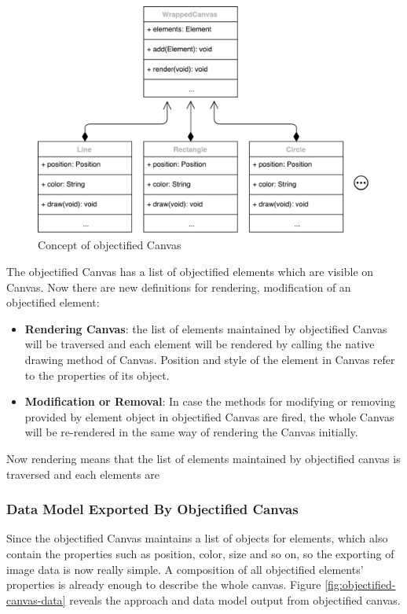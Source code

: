 \begin{figure}[!htbp]
  \centering
    \includegraphics[width=1\textwidth]{Figures/concept-wrapped-canvas.pdf}
  \caption{Concept of objectified Canvas}
  \label{fig:objectified-canvas}
\end{figure}
The objectified Canvas has a list of objectified elements which are visible on Canvas. Now there are new definitions for rendering, modification of an objectified element:
\begin{itemize}
\item
\textbf{Rendering Canvas}: the list of elements maintained by objectified Canvas will be traversed and each element will be rendered by calling the native drawing method of Canvas. Position and style of the element in Canvas refer to the properties of its object.  
\item
\textbf{Modification or Removal}: In case the methods for modifying or removing provided by element object in objectified Canvas are fired, the whole Canvas will be re-rendered in the same way of rendering the Canvas initially.

\end{itemize}
Now rendering means that the list of elements maintained by objectified canvas is traversed and each elements are 

\subsubsection{Data Model Exported By Objectified Canvas}
Since the objectified Canvas maintains a list of objects for elements, which also contain the properties such as position, color, size and so on, so the exporting of image data is now really simple. A composition of all objectified elements' properties is already enough to describe the whole canvas. Figure \ref{fig:objectified-canvas-data} reveals the approach and data model output from objectified 
canvas.

